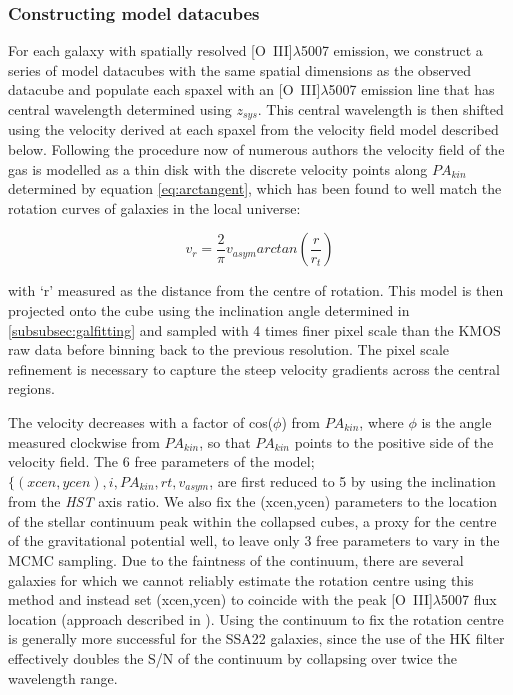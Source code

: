 \documentclass[fleqn,usenatbib]{mn2e}
\begin{document}
\subsubsection{Constructing model datacubes}\label{subsubec:model_cube}
For each galaxy with spatially resolved [O~{\sc III}]$\lambda$5007 emission, we construct a series of model datacubes with the same spatial dimensions as the observed datacube and populate each spaxel with an [O~{\sc III}]$\lambda$5007 emission line that has central wavelength determined using $z_{sys}$.
This central wavelength is then shifted using the velocity derived at each spaxel from the velocity field model described below.  
Following the procedure now of numerous authors \citep[e.g.][]{Epinat2010,Epinat2012,Swinbank2012,Stott2016,Mason2016} the velocity field of the gas is modelled as a thin disk with the discrete velocity points along $PA_{kin}$ determined by equation \ref{eq:arctangent}, which has been found to well match the rotation curves of galaxies in the local universe:

\begin{equation}\label{eq:arctangent}
   v_{r} = \frac{2}{\pi}v_{asym}arctan\left(\frac{r}{r_{t}}\right)
\end{equation}

\noindent
with `r' measured as the distance from the centre of rotation.
This model is then projected onto the cube using the inclination angle determined in \cref{subsubsec:galfitting} and sampled with 4 times finer pixel scale than the KMOS raw data before binning back to the previous resolution.
The pixel scale refinement is necessary to capture the steep velocity gradients across the central regions.

The velocity decreases with a factor of cos($\phi$) from $PA_{kin}$, where $\phi$ is the angle measured clockwise from $PA_{kin}$, so that $PA_{kin}$ points to the positive side of the velocity field.
The 6 free parameters of the model; $\{(xcen, ycen), i, PA_{kin}, rt, v_{asym}$, are first reduced to 5 by using the inclination from the {\em HST} axis ratio.
We also fix the (xcen,ycen) parameters to the location of the stellar continuum peak within the collapsed cubes, a proxy for the centre of the gravitational potential well, to leave only 3 free parameters to vary in the MCMC sampling.
Due to the faintness of the continuum, there are several galaxies for which we cannot reliably estimate the rotation centre using this method and instead set (xcen,ycen) to coincide with the peak [O~{\sc III}]$\lambda$5007 flux location (approach described in \citealt{Harrison2017}).
Using the continuum to fix the rotation centre is generally more successful for the SSA22 galaxies, since the use of the HK filter effectively doubles the S/N of the continuum by collapsing over twice the wavelength range. \\
\end{document}
